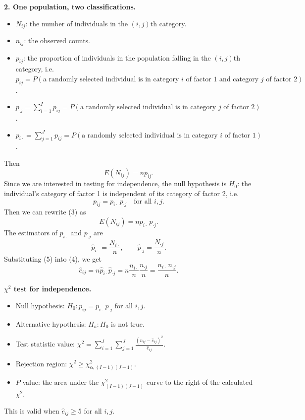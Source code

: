 \textbf{2. One population, two classifications.}
\begin{itemize}
  \item $N_{ij}$: the number of individuals in the $(i,j)$th category.
  \item $n_{ij}$: the observed counts.
  \item $p_{ij}$: the proportion of individuals in the population falling in the $(i,j)$th category, i.e.
  $p_{ij}=P(\text{a randomly selected individual is in category } i \text{ of factor 1 and category } j \text{ of factor 2})$.
  \item $p_{\cdot j}=\sum_{i=1}^I p_{ij}=P(\text{a randomly selected individual is in category } j \text{ of factor 2})$.
  \item $p_{i\cdot}=\sum_{j=1}^J p_{ij}=P(\text{a randomly selected individual is in category } i \text{ of factor 1})$.
\end{itemize}
Then
\[
E(N_{ij}) = np_{ij}. \tag{3}
\]
Since we are interested in testing for independence, the null hypothesis is
$H_0$: the individual's category of factor 1 is independent of its category of factor 2, i.e.
\[
p_{ij}=p_{i\cdot}\,p_{\cdot j}\quad\text{for all } i,j.
\]
Then we can rewrite (3) as
\[
E(N_{ij}) = np_{i\cdot}\,p_{\cdot j}. \tag{4}
\]
The estimators of $p_{i\cdot}$ and $p_{\cdot j}$ are
\[
\hat{p}_{i\cdot}=\frac{N_{i\cdot}}{n},\qquad \hat{p}_{\cdot j}=\frac{N_{\cdot j}}{n}. \tag{5}
\]
Substituting (5) into (4), we get
\[
\hat{e}_{ij} = n\hat{p}_{i\cdot}\hat{p}_{\cdot j} = n\frac{n_{i\cdot}}{n}\frac{n_{\cdot j}}{n} = \frac{n_{i\cdot}\,n_{\cdot j}}{n}.
\]

\textbf{$\chi^2$ test for independence.}
\begin{itemize}
  \item Null hypothesis: $H_0: p_{ij}=p_{i\cdot}\,p_{\cdot j}$ for all $i,j$.
  \item Alternative hypothesis: $H_a: H_0$ is not true.
  \item Test statistic value: $\displaystyle\chi^2=\sum_{i=1}^I\sum_{j=1}^J\frac{(n_{ij}-\hat{e}_{ij})^2}{\hat{e}_{ij}}$.
  \item Rejection region: $\chi^2\ge\chi^2_{\alpha,(I-1)(J-1)}$.
  \item $P$-value: the area under the $\chi^2_{(I-1)(J-1)}$ curve to the right of the calculated $\chi^2$.
\end{itemize}
This is valid when $\hat{e}_{ij}\ge5$ for all $i,j$.
